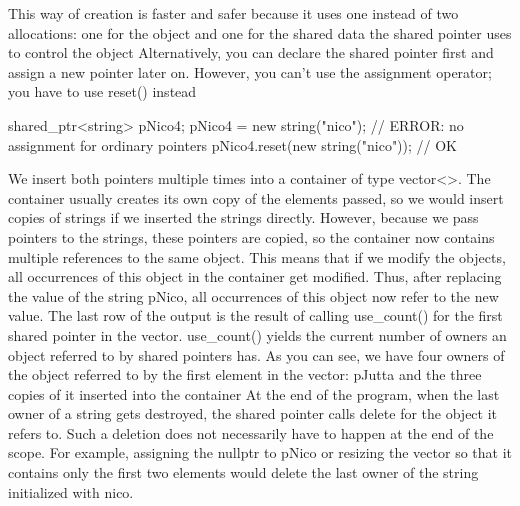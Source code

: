 \documentclass{report}
\begin{document}
\bigbreak \noindent 
This way of creation is faster and safer because it uses one instead of two allocations: one for the object and one for the shared data the shared pointer uses to control the object
\bigbreak \noindent 
Alternatively, you can declare the shared pointer first and assign a new pointer later on. However, you can’t use the assignment operator; you have to use reset() instead
\bigbreak \noindent 
\begin{cppcode}
shared_ptr<string> pNico4;
pNico4 = new string("nico"); // ERROR: no assignment for ordinary pointers
pNico4.reset(new string("nico")); // OK
\end{cppcode}
\bigbreak \noindent 
{}
\bigbreak \noindent 
We insert both pointers multiple times into a container of type vector<>. The container usually creates its own copy of the elements passed, so we would insert
copies of strings if we inserted the strings directly. However, because we pass pointers to the strings,
these pointers are copied, so the container now contains multiple references to the same object. This
means that if we modify the objects, all occurrences of this object in the container get modified.
Thus, after replacing the value of the string pNico, all occurrences of this object now refer to the new value.\bigbreak \noindent 
The last row of the output is the result of calling use\_count() for the first shared pointer in the
vector. use\_count() yields the current number of owners an object referred to by shared pointers
has. As you can see, we have four owners of the object referred to by the first element in the vector:
pJutta and the three copies of it inserted into the container
\bigbreak \noindent 
At the end of the program, when the last owner of a string gets destroyed, the shared pointer calls
delete for the object it refers to. Such a deletion does not necessarily have to happen at the end of
the scope. For example, assigning the nullptr to pNico or resizing
the vector so that it contains only the first two elements would delete the last owner of the string
initialized with nico.
\bigbreak \noindent 
\end{document}
